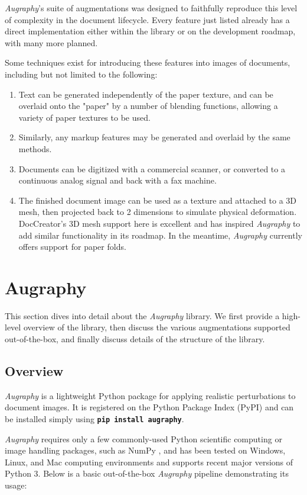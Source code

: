 \documentclass[runningheads]{llncs}
\begin{document}
\emph{Augraphy}'s suite of augmentations was designed to faithfully reproduce this level of complexity in the document lifecycle. Every feature just listed already has a direct implementation either within the library or on the development roadmap, with many more planned.

Some techniques exist for introducing these features into images of documents, including but not limited to the following:
\begin{enumerate}
\item Text can be generated independently of the paper texture, and can be overlaid onto the "paper" by a number of blending functions, allowing a variety of paper textures to be used.
\item Similarly, any markup features may be generated and overlaid by the same methods.
\item Documents can be digitized with a commercial scanner, or converted to a continuous analog signal and back with a fax machine.
\item The finished document image can be used as a texture and attached to a 3D mesh, then projected back to 2 dimensions to simulate physical deformation. DocCreator's 3D mesh support here is excellent and has inspired \emph{Augraphy} to add similar functionality in its roadmap.  In the meantime, \emph{Augraphy} currently offers support for paper folds.
\end{enumerate}

\section{Augraphy}
This section dives into detail about the \emph{Augraphy} library.
We first provide a high-level overview of the library, then discuss the various augmentations supported out-of-the-box, and finally discuss details of the structure of the library.

\subsection{Overview}

\emph{Augraphy} is a lightweight Python package for applying realistic perturbations to document images. It is registered on the Python Package Index (PyPI) and can be installed simply using \colorbox{superlightgray}{\textbf{\texttt{pip install augraphy}}}.

\emph{Augraphy} requires only a few commonly-used Python scientific computing or image handling packages, such as NumPy \cite{ref_numpy}, and has been tested on Windows, Linux, and Mac computing environments and supports recent major versions of Python 3.  Below is a basic out-of-the-box \emph{Augraphy} pipeline demonstrating its usage:
\end{document}
